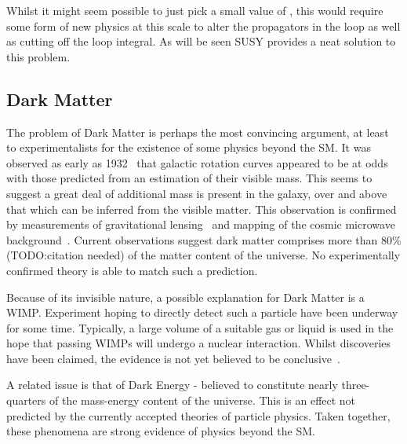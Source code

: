 Whilst it might seem possible to just pick a small value of \LambdaUV, this
would require some form of new physics at this scale to alter the propagators in
the loop as well as cutting off the loop integral. As will be seen \ac{SUSY}
provides a neat solution to this problem.

\subsection{Dark Matter}
\label{sec:susy_darkmatter}
The problem of Dark Matter is perhaps the most convincing argument, at least to
experimentalists for the existence of some physics beyond the \ac{SM}. It was
observed as early as 1932~\cite{darkmatter_review} that galactic rotation curves
appeared to be at odds with those predicted from an estimation of their visible
mass. This seems to suggest a great deal of additional mass is present in the
galaxy, over and above that which can be inferred from the visible matter. This
observation is confirmed by measurements of gravitational
lensing~\cite{bullet_cluster} and mapping of the cosmic microwave
background~\cite{wmap_7year}. Current observations suggest dark matter comprises
more than 80\% (TODO:citation needed) of the matter content of the universe. No
experimentally confirmed theory is able to match such a prediction.

Because of its invisible nature, a possible explanation for Dark Matter is a
\acl{WIMP}. Experiment hoping to directly detect such a particle have been
underway for some time. Typically, a large volume of a suitable gas or liquid is
used in the hope that passing \acp{WIMP} will undergo a nuclear
interaction. Whilst discoveries have been claimed, the evidence is not yet
believed to be conclusive~\cite{dama_libra}.

A related issue is that of Dark Energy - believed to constitute nearly
three-quarters of the mass-energy content of the universe. This is an effect not
predicted by the currently accepted theories of particle physics. Taken
together, these phenomena are strong evidence of physics beyond the \ac{SM}.

